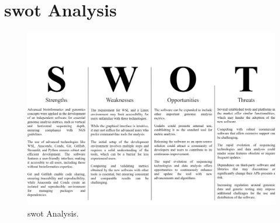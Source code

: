 \section{\ac{swot} Analysis}
\begin{figure}[H]
    \centering
    \includegraphics[width=1\textwidth]{figs/swot.png}
    \caption{\ac{swot} Analysis.} 
    \label{fig:swot}
\end{figure}
